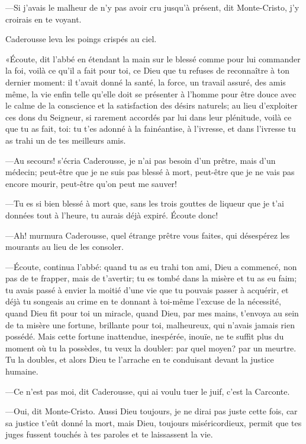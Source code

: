 —Si j'avais le malheur de n'y pas avoir cru jusqu'à présent, dit Monte-Cristo, j'y croirais en te voyant. 

Caderousse leva les poings crispés au ciel. 

«Écoute, dit l'abbé en étendant la main sur le blessé comme pour lui commander la foi, voilà ce qu'il a fait pour toi, ce Dieu que tu refuses de reconnaître à ton dernier moment: il t'avait donné la santé, la force, un travail assuré, des amis même, la vie enfin telle qu'elle doit se présenter à l'homme pour être douce avec le calme de la conscience et la satisfaction des désirs naturels; au lieu d'exploiter ces dons du Seigneur, si rarement accordés par lui dans leur plénitude, voilà ce que tu as fait, toi: tu t'es adonné à la fainéantise, à l'ivresse, et dans l'ivresse tu as trahi un de tes meilleurs amis. 

—Au secours! s'écria Caderousse, je n'ai pas besoin d'un prêtre, mais d'un médecin; peut-être que je ne suis pas blessé à mort, peut-être que je ne vais pas encore mourir, peut-être qu'on peut me sauver! 

—Tu es si bien blessé à mort que, sans les trois gouttes de liqueur que je t'ai données tout à l'heure, tu aurais déjà expiré. Écoute donc! 

—Ah! murmura Caderousse, quel étrange prêtre vous faites, qui désespérez les mourants au lieu de les consoler. 

—Écoute, continua l'abbé: quand tu as eu trahi ton ami, Dieu a commencé, non pas de te frapper, mais de t'avertir; tu es tombé dans la misère et tu as eu faim; tu avais passé à envier la moitié d'une vie que tu pouvais passer à acquérir, et déjà tu songeais au crime en te donnant à toi-même l'excuse de la nécessité, quand Dieu fit pour toi un miracle, quand Dieu, par mes mains, t'envoya au sein de ta misère une fortune, brillante pour toi, malheureux, qui n'avais jamais rien possédé. Mais cette fortune inattendue, inespérée, inouïe, ne te suffit plus du moment où tu la possèdes, tu veux la doubler: par quel moyen? par un meurtre. Tu la doubles, et alors Dieu te l'arrache en te conduisant devant la justice humaine. 

—Ce n'est pas moi, dit Caderousse, qui ai voulu tuer le juif, c'est la Carconte.  

—Oui, dit Monte-Cristo. Aussi Dieu toujours, je ne dirai pas juste cette fois, car sa justice t'eût donné la mort, mais Dieu, toujours miséricordieux, permit que tes juges fussent touchés à tes paroles et te laissassent la vie. 

